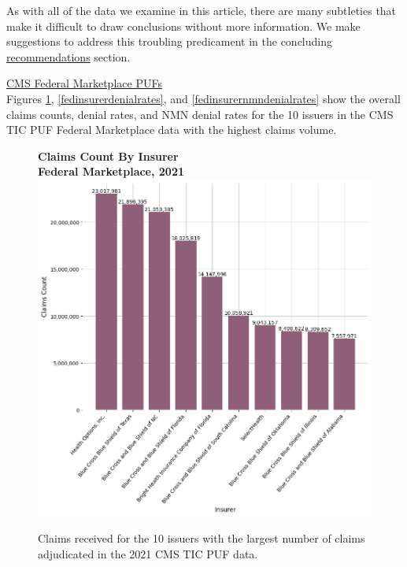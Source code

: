 \documentclass[12pt, a4paper,twoside,parskip=full]{report}
\theoremstyle{plain} %
\theoremstyle{definition} %
\theoremstyle{remark} %
\numberwithin{equation}{chapter}
\begin{document}
		As with all of the data we examine in this article, there are many subtleties that make it difficult to draw conclusions without more information. We make suggestions to address this troubling predicament in the concluding \hyperref[recommendations]{recommendations} section.

		
		\underline{CMS Federal Marketplace PUFs}\\
		
		Figures \ref{fedinsurerclaims}, \ref{fedinsurerdenialrates}, and \ref{fedinsurernmndenialrates} show the overall claims counts, denial rates, and NMN denial rates for the 10 issuers in the CMS TIC PUF Federal Marketplace data with the highest claims volume.
		
		
		\begin{figure}[h!]
			\centering
			\textbf{Claims Count By Insurer}\\
			\textbf{Federal Marketplace, 2021}\\
			\includegraphics[width=\columnwidth]{images/cms_puf/claims_by_insurer.png}
			\caption{Claims received for the 10 issuers with the largest number of claims adjudicated in the 2021 CMS TIC PUF data.}
			\label{fedinsurerclaims}
		\end{figure}
	
		\clearpage
	
\end{document}
